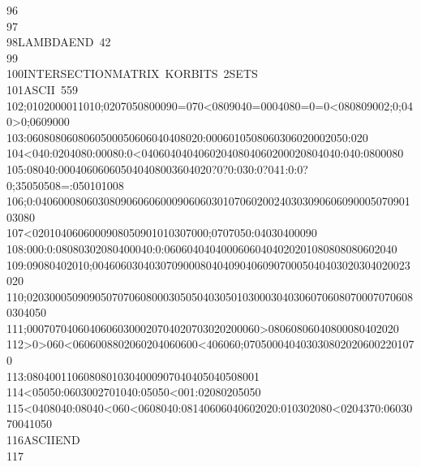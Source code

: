 \begin{tabbing}
96\>\\[-7pt]
97\>\\[-7pt]
98\>LAMBDAEND\ 42\\[-7pt]
99\>\\[-7pt]
100\>INTERSECTIONMATRIX\ KORBITS\ 2SETS\\[-7pt]
101\>ASCII\ 559\\[-7pt]
102;0102000011010;0207050800090=070<0809040=0004080=0=0<080809002;0;040>0;0609000\\[-7pt]
103:0608080608060500050606040408020:0006010508060306020002050:020\\[-7pt]
104<040:0204080:00080:0<04060404040602040804060200020804040:040:0800080\\[-7pt]
105:08040:000406060605040408003604020?0?0:030:0?041:0:0?0;35050508=:050101008\\[-7pt]
106;0:04060008060308090606060009060603010706020024030309060609000507090103080\\[-7pt]
107<0201040606000908050901010307000;0707050:04030400090\\[-7pt]
108:000:0:08080302080400040:0:06060404040006060404020201080808080602040\\[-7pt]
109:09080402010;00460603040307090008040409040609070005040403020304020023020\\[-7pt]
110;020300050909050707060800030505040305010300030403060706080700070706080304050\\[-7pt]
111;00070704060406060300020704020703020200060>08060806040800080402020\\[-7pt]
112>0>060<0606008802060204060600<406060;0705000404030308020206002201070\\[-7pt]
113:08040011060808010304000907040405040508001\\[-7pt]
114<05050:0603002701040:05050<001:02080205050\\[-7pt]
115<0408040:08040<060<0608040:08140606040602020:010302080<0204370:0603070041050\\[-7pt]
116\>ASCIIEND\\[-7pt]
117\>\end{tabbing}
